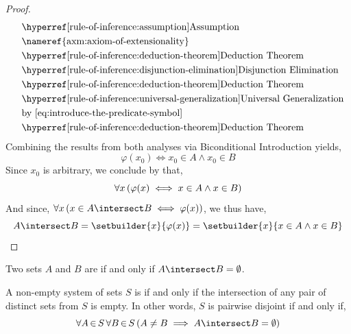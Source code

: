 \begin{proof}
\begin{equation*}
\begin{aligned}
            &\quad\text{\aref{rule-of-inference:assumption}{Assumption}}\\
            &\quad\text{\nameref{axm:axiom-of-extensionality}}\\
            &\quad\text{\aref{rule-of-inference:deduction-theorem}{Deduction Theorem}}\\
            &\quad\text{\aref{rule-of-inference:disjunction-elimination}{Disjunction Elimination}}\\
            &\quad\text{\aref{rule-of-inference:deduction-theorem}{Deduction Theorem}}\\
            &\quad\text{\aref{rule-of-inference:universal-generalization}{Universal Generalization}}\\
            &\quad\text{by \eqref{eq:introduce-the-predicate-symbol}}\\
            &\quad\text{\aref{rule-of-inference:deduction-theorem}{Deduction Theorem}}
        \end{aligned}
    \end{equation*}
    Combining the results from both analyses via Biconditional Introduction yields,
    \begin{equation*}
        \varphi(x_{0}) \iff x_{0} \in A \land x_{0} \in B
    \end{equation*}
    Since \( x_{0} \) is arbitrary, we conclude by  that,
    \begin{equation*}
        \forall x \, \mleft( \varphi(x) \iff x \in A \land x \in B \mright)
    \end{equation*}
    And since, \( \forall x \, \mleft( x \in A \intersect B \iff \varphi(x) \mright) \), we thus have,
    \begin{equation*}
        A \intersect B = \setbuilder{x}{\varphi(x)} = \setbuilder{x}{x \in A \land x \in B} \qedhere
    \end{equation*}
\end{proof}

\begin{dfn}[Disjoint]
    \label{dfn:disjoint-two-sets}
    Two sets \( A \) and \( B \) are  if and only if \( A \intersect B = \emptyset \).
\end{dfn}

\begin{dfn}
    \label{dfn:pairwise-disjoint-sets}
    A non-empty system of sets \( S \) is  if and only if the intersection of any pair of distinct
    sets from \( S \) is empty. In other words, \( S \) is pairwise disjoint if and only if,
    \begin{equation*}
        \forall A \,{\in}\, S \, \forall B\,{\in}\,S \, \mleft( A \neq B \implies A \intersect B = \emptyset \mright)
    \end{equation*}
\end{dfn}


